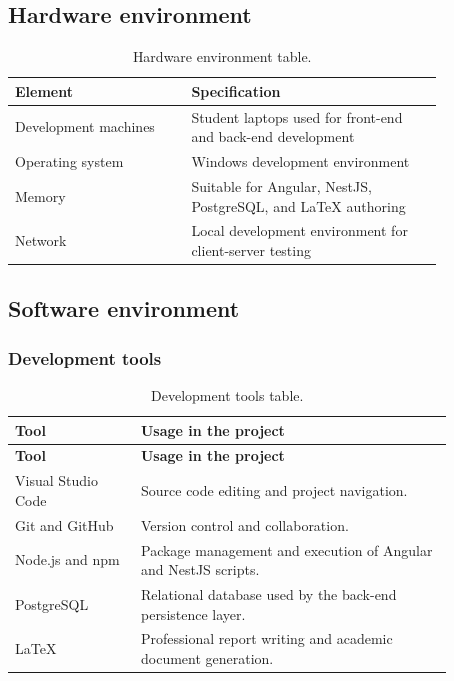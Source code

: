 \subsection{Hardware environment}
\begin{table}[!htpb]
\caption{Hardware environment table.}
\centering
\begin{tabular}{|p{0.35\linewidth}|p{0.5\linewidth}|}
\hline
\textbf{Element} & \textbf{Specification} \\ \hline
Development machines & Student laptops used for front-end and back-end development \\ \hline
Operating system & Windows development environment \\ \hline
Memory & Suitable for Angular, NestJS, PostgreSQL, and LaTeX authoring \\ \hline
Network & Local development environment for client-server testing \\ \hline
\end{tabular}
\label{tab:hardware_env}
\end{table}

\subsection{Software environment}
\subsubsection{Development tools}
\begin{longtable}{|p{0.25\linewidth}|p{0.62\linewidth}|}
\caption{Development tools table.} \label{tab:development_tools} \\
\hline
\textbf{Tool} & \textbf{Usage in the project} \\ \hline
\endfirsthead
\hline
\textbf{Tool} & \textbf{Usage in the project} \\ \hline
\endhead
\hline
\endfoot
Visual Studio Code & Source code editing and project navigation. \\ \hline
Git and GitHub & Version control and collaboration. \\ \hline
Node.js and npm & Package management and execution of Angular and NestJS scripts. \\ \hline
PostgreSQL & Relational database used by the back-end persistence layer. \\ \hline
LaTeX & Professional report writing and academic document generation. \\ \hline
\end{longtable}

